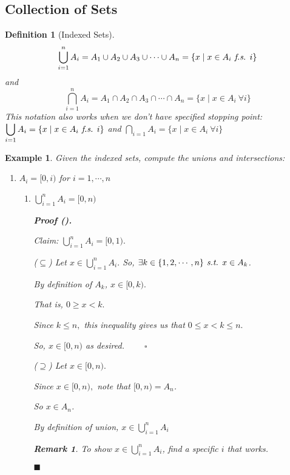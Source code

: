 \documentclass[12pt,a4paper]{article}
\newtheorem{df}{Definition}[subsection]
\newtheorem{eg}{Example}[subsection]
\newcounter{nprf}[subsection]
\newtheorem*{rmk}{\indent Remark}
\newenvironment*{prf}{\par\indent\textbf{\textit{Proof} (\stepcounter{nprf}\thenprf). }\par }{\par\hfill $\blacksquare$\par}
\def\st{\emph{ s.t. }}
\def\fs{\emph{ f.s. }}
\begin{document}
\subsection{Collection of Sets}
\begin{df}[Indexed Sets]
	\[\bigcup_{i=1}^nA_i=A_1\cup A_2\cup A_3\cup\cdots\cup A_n=\{x\mid x\in A_i \fs i\}\] and \[\bigcap_{i=1}^nA_i=A_1\cap A_2\cap A_3\cap\cdots\cap A_n=\{x\mid x\in A_i\ \forall i\}\] This notation also works when we don't have specified stopping point: $\displaystyle\bigcup_{i=1}A_i=\{x\mid x\in A_i\fs i\}$ and $\displaystyle \bigcap_{i=1}A_i=\{x\mid x\in A_i\ \forall i\}$
\end{df}
\begin{eg}
	Given the indexed sets, compute the unions and intersections:
	\begin{enumerate}
		\item $A_i=[0,i)$ for $i=1,\cdots,n$
		\begin{enumerate}
			\item $\displaystyle\bigcup_{i=1}^n A_i=[0,n)$
			\begin{prf}
			Claim: $\displaystyle\bigcup_{i=1}^n A_i=[0,1).$\par($\subseteq$) Let $\displaystyle x\in\bigcup_{i=1}^n A_i.$ So, $\exists k\in\qty{1, 2,\cdots,n}\st x\in A_k$.\par\hspace{5mm}By definition of $A_k$, $x\in[0,k).$\par\hspace{5mm}That is, $0\geq x<k.$\par\hspace{5mm}Since $k\leq n,$ this inequality gives us that $0\leq x<k\leq n.$\par\hspace{5mm}So, $x\in[0,n)$ as desired. $\qquad\square$\par($\supseteq$) Let $x\in[0,n).$\par\hspace{5mm}Since $x\in[0,n),$ note that $[0,n)=A_n$.\par\hspace{5mm}So $x\in A_n$.\par\hspace{5mm}By definition of union, $x\in\displaystyle\bigcup_{i=1}^n A_i$
			\begin{rmk} To show $\displaystyle x\in\bigcup_{i=1}^n A_i$, find a specific $i$ that works. \end{rmk}	
			\end{prf}

\end{enumerate}
\end{enumerate}
\end{eg}
\end{document}
